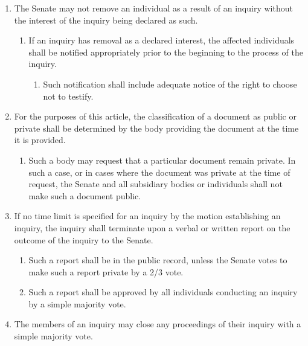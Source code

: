 \begin{enumerate}
\begin{enumerate}
\begin{enumerate}
    \end{enumerate}
  \item To compel the provision of documents belonging to the Union, which includes but is not limited to Bylaws, meeting minutes, committee records, and attendance records, in such cases where an individual or body does not comply with a request for such documents pursuant to subclause (ii).
    \begin{enumerate}
    \item No documents may be compelled which are reasonably considered to be primarily the private affairs of individuals. All contests regarding this provision shall be appealed to the Judicial Board.
    \end{enumerate}
  \end{enumerate}
\item The Senate may not remove an individual as a result of an inquiry without the interest of the inquiry being declared as such.
  \begin{enumerate}
  \item If an inquiry has removal as a declared interest, the affected individuals shall be notified appropriately prior to the beginning to the process of the inquiry.
    \begin{enumerate}
    \item Such notification shall include adequate notice of the right to choose not to testify.
    \end{enumerate}
  \end{enumerate}
\item For the purposes of this article, the classification of a document as public or private shall be determined by the body providing the document at the time it is provided.
  \begin{enumerate}
  \item Such a body may request that a particular document remain private. In such a case, or in cases where the document was private at the time of request, the Senate and all subsidiary bodies or individuals shall not make such a document public.
  \end{enumerate}
\item If no time limit is specified for an inquiry by the motion establishing an inquiry, the inquiry shall terminate upon a verbal or written report on the outcome of the inquiry to the Senate.
  \begin{enumerate}
  \item Such a report shall be in the public record, unless the Senate votes to make such a report private by a 2/3 vote.
  \item Such a report shall be approved by all individuals conducting an inquiry by a simple majority vote.
  \end{enumerate}
\item The members of an inquiry may close any proceedings of their inquiry with a simple majority vote.
\end{enumerate}
